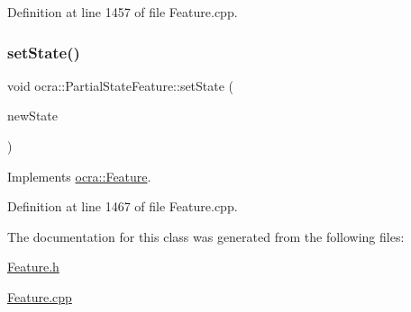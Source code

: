 Definition at line 1457 of file Feature.\+cpp.

\hypertarget{classocra_1_1PartialStateFeature_a89e830a1d3bea028431c4ae0844a6d95}{}\label{classocra_1_1PartialStateFeature_a89e830a1d3bea028431c4ae0844a6d95} 
\subsubsection{\texorpdfstring{set\+State()}{setState()}}
{\footnotesize\ttfamily void ocra\+::\+Partial\+State\+Feature\+::set\+State (\begin{DoxyParamCaption}\item[{const \hyperlink{classocra_1_1TaskState}{Task\+State} \&}]{new\+State }\end{DoxyParamCaption})\hspace{0.3cm}{\ttfamily [virtual]}}



Implements \hyperlink{classocra_1_1Feature_ad16d6b176b229280649ab405531e9a30}{ocra\+::\+Feature}.



Definition at line 1467 of file Feature.\+cpp.



The documentation for this class was generated from the following files\+:\begin{DoxyCompactItemize}
\item 
\hyperlink{Feature_8h}{Feature.\+h}\item 
\hyperlink{Feature_8cpp}{Feature.\+cpp}\end{DoxyCompactItemize}
